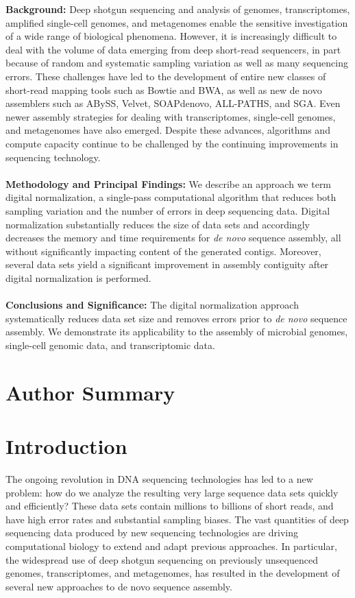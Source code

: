 \documentclass[10pt]{article}
\begin{document}
{\bf Background:} Deep shotgun sequencing and analysis of genomes,
transcriptomes, amplified single-cell genomes, and metagenomes enable
the sensitive investigation of a wide range of biological
phenomena. However, it is increasingly difficult to deal with the volume of data
emerging from deep short-read sequencers, in part because of random
and systematic sampling variation as well as many sequencing errors.
These challenges have led to the development of entire new classes of
short-read mapping tools such as Bowtie and BWA, as well as new de
novo assemblers such as ABySS, Velvet, SOAPdenovo, ALL-PATHS, and SGA.
Even newer assembly strategies for dealing with transcriptomes,
single-cell genomes, and metagenomes have also emerged.  Despite these
advances, algorithms and compute capacity continue to be challenged by
the continuing improvements in sequencing technology.
\\
\\
{\bf Methodology and Principal Findings:} We describe an approach we term
digital normalization, a single-pass computational algorithm that
reduces both sampling variation and the number of errors in deep sequencing data. Digital normalization substantially
reduces the size of data sets and accordingly decreases the memory and time
requirements for {\em de novo} sequence assembly, all without significantly
impacting content of the generated contigs.  Moreover, several data sets
yield a significant improvement in assembly contiguity after digital normalization
is performed.
\\
\\
{\bf Conclusions and Significance:} The digital normalization approach
systematically reduces data set size and removes errors prior to {\em
de novo} sequence assembly.  We demonstrate its
applicability to the assembly of microbial genomes, single-cell
genomic data, and transcriptomic data.

\section*{Author Summary}

\section*{Introduction}

The ongoing revolution in DNA sequencing technologies has led to a new
problem: how do we analyze the resulting very large sequence data sets
quickly and efficiently? These data sets contain millions to billions
of short reads, and have high error rates and substantial sampling
biases.  The vast quantities of deep sequencing data produced by
new sequencing technologies are driving
computational biology to extend and adapt previous approaches.  In
particular, the widespread use of deep shotgun sequencing on
previously unsequenced genomes, transcriptomes, and metagenomes, has
resulted in the development of several new approaches to de novo
sequence assembly.
\end{document}
